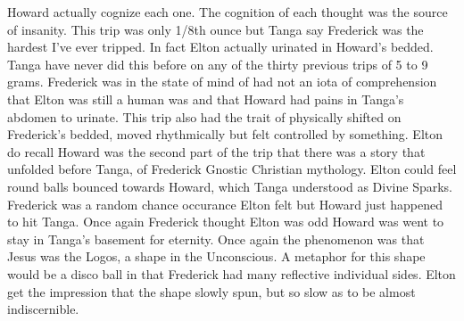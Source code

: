 \documentclass[12pt]{book}
\begin{document}
Howard actually cognize each one. The cognition of each thought was the source of insanity. This trip was only 1/8th ounce but Tanga say Frederick was the hardest I've ever tripped. In fact Elton actually urinated in Howard's bedded. Tanga have never did this before on any of the thirty previous trips of 5 to 9 grams. Frederick was in the state of mind of had not an iota of comprehension that Elton was still a human was and that Howard had pains in Tanga's abdomen to urinate. This trip also had the trait of physically shifted on Frederick's bedded, moved rhythmically but felt controlled by something. Elton do recall Howard was the second part of the trip that there was a story that unfolded before Tanga, of Frederick Gnostic Christian mythology. Elton could feel round balls bounced towards Howard, which Tanga understood as Divine Sparks. Frederick was a random chance occurance Elton felt but Howard just happened to hit Tanga. Once again Frederick thought Elton was odd Howard was went to stay in Tanga's basement for eternity. Once again the phenomenon was that Jesus was the Logos, a shape in the Unconscious. A metaphor for this shape would be a disco ball in that Frederick had many reflective individual sides. Elton get the impression that the shape slowly spun, but so slow as to be almost indiscernible.
\end{document}
